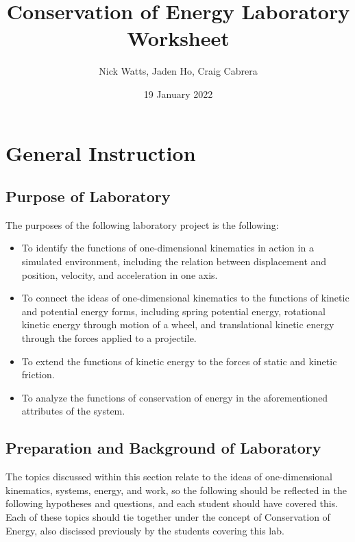 \documentclass[12pt, letterpaper]{report}
\title{Conservation of Energy Laboratory Worksheet}
\author{Nick Watts, Jaden Ho, Craig Cabrera}
\date{19 January 2022}
\begin{document}
  \maketitle
  \tableofcontents
\pagebreak
  \chapter{General Instruction}
    \section{Purpose of Laboratory}
      \par The purposes of the following laboratory project is the following:
      \begin{itemize}
        \item{To identify the functions of one-dimensional kinematics in action in a simulated environment, including the relation between displacement and position, velocity, and acceleration in one axis.}
        \item{To connect the ideas of one-dimensional kinematics to the functions of kinetic and potential energy forms, including spring potential energy, rotational kinetic energy through motion of a wheel, and translational kinetic energy through the forces applied to a projectile.}
        \item{To extend the functions of kinetic energy to the forces of static and kinetic friction.}
        \item{To analyze the functions of conservation of energy in the aforementioned attributes of the system.}
      \end{itemize}
    \section{Preparation and Background of Laboratory}
      \par The topics discussed within this section relate to the ideas of one-dimensional kinematics, systems, energy, and work, so the following should be reflected in the following hypotheses and questions, and each student should have covered this. Each of these topics should tie together under the concept of Conservation of Energy, also discissed previously by the students covering this lab.
    \pagebreak
\end{document}
